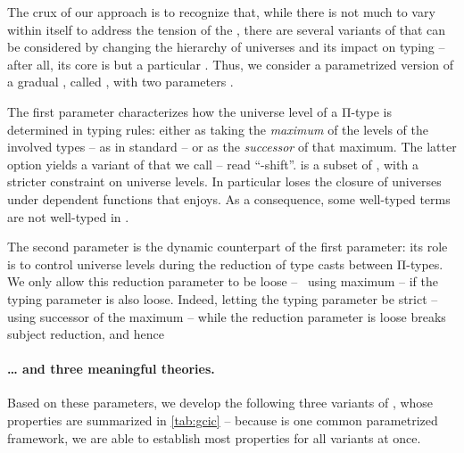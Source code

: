 The crux of our approach is to recognize that, while there is not much to vary within  itself to address the tension of the ,
there are several variants of  that can be considered by changing
the hierarchy of universes and its impact on typing –
after all, its core 
is but a particular  .
Thus, we consider a parametrized version of a gradual , called
, with two parameters%
.

The first parameter characterizes how the universe level of a Π-type is determined
in typing rules: either as taking the \emph{maximum} of the levels of the involved 
types – as in standard  – or as the \emph{successor} of that maximum.
The latter option yields a variant of  that we call  – read “-shift”.
 is a subset of , with a stricter constraint on universe levels.
In particular  loses the closure of universes under
dependent functions that  enjoys.
As a consequence, some well-typed  terms are not well-typed in .%

The second parameter is the dynamic counterpart of the first parameter:
its role is to control universe levels during the reduction of type casts between Π-types.
We only allow this reduction parameter to be loose – \ie~using maximum –
if the typing parameter is also loose. Indeed, letting the typing parameter be strict 
– \ie using successor of the maximum – while the reduction parameter is loose
breaks subject reduction, and hence 

\paragraph{… and three meaningful theories.}

Based on these parameters, we develop the following three variants of ,
whose properties are summarized in \cref{tab:gcic}
– because  is one common parametrized framework,
we are able to establish most properties for all variants at once.

